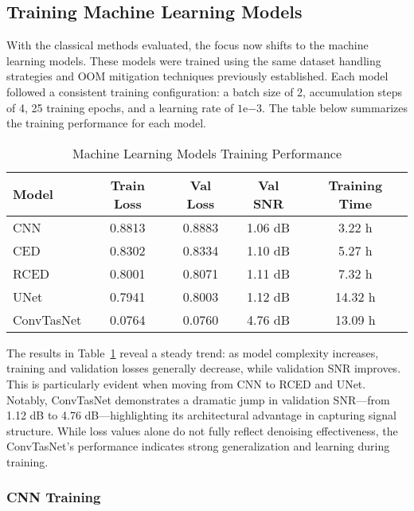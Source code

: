 \subsection{Training Machine Learning Models}
\label{sec:training_ml_models}

With the classical methods evaluated, the focus now shifts to the machine learning models. These models were trained using the same dataset handling strategies and OOM mitigation techniques previously established. Each model followed a consistent training configuration: a batch size of 2, accumulation steps of 4, 25 training epochs, and a learning rate of $1\text{e}{-3}$. The table below summarizes the training performance for each model.

\vspace{1em}
\begin{table}[H]
\centering
\caption{Machine Learning Models Training Performance}
\label{tab:ml_training}
\begin{tabular}{|l|c|c|c|c|}
\hline
\textbf{Model} & \textbf{Train Loss} & \textbf{Val Loss} & \textbf{Val SNR} & \textbf{Training Time} \\
\hline
CNN         & 0.8813 & 0.8883 & 1.06 dB & 3.22 h \\
CED         & 0.8302 & 0.8334 & 1.10 dB & 5.27 h \\
RCED        & 0.8001 & 0.8071 & 1.11 dB & 7.32 h \\
UNet        & 0.7941 & 0.8003 & 1.12 dB & 14.32 h \\
ConvTasNet  & 0.0764 & 0.0760 & 4.76 dB & 13.09 h \\
\hline
\end{tabular}
\end{table}

The results in Table~\ref{tab:ml_training} reveal a steady trend: as model complexity increases, training and validation losses generally decrease, while validation SNR improves. This is particularly evident when moving from CNN to RCED and UNet. Notably, ConvTasNet demonstrates a dramatic jump in validation SNR—from 1.12 dB to 4.76 dB—highlighting its architectural advantage in capturing signal structure. While loss values alone do not fully reflect denoising effectiveness, the ConvTasNet's performance indicates strong generalization and learning during training.

\subsubsection{CNN Training}
\label{sec:cnn_training}

